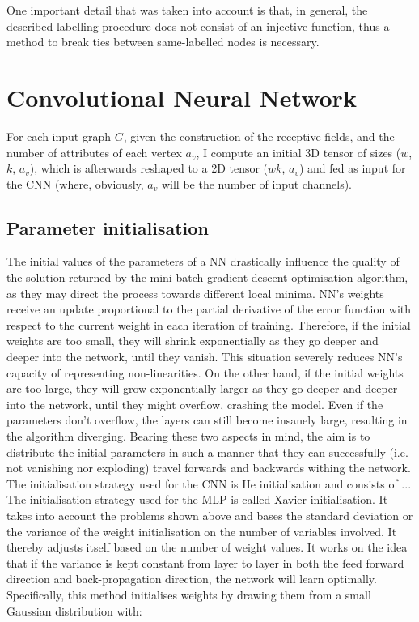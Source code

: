 One important detail that was taken into account is that, in general, the described labelling procedure does not consist of an injective function, thus a method to break ties between same-labelled nodes is necessary.

\section{Convolutional Neural Network}

For each input graph $G$, given the construction of the receptive fields, and the number of attributes of each vertex $a_v$, I compute an initial 3D tensor of sizes ($w$, $k$, $a_v$), which is afterwards reshaped to a 2D tensor ($wk$, $a_v$) and fed as input for the CNN (where, obviously, $a_v$ will be the number of input channels). \\

\subsection{Parameter initialisation}

The initial values of the parameters of a NN drastically influence the quality of the solution returned by the mini batch gradient descent optimisation algorithm, as they may direct the process towards different local minima. NN's weights receive an update proportional to the partial derivative of the error function with respect to the current weight in each iteration of training. Therefore, if the initial weights are too small, they will shrink exponentially as they go deeper and deeper into the network, until they vanish. This situation severely reduces NN's capacity of representing non-linearities. On the other hand, if the initial weights are too large, they will grow exponentially larger as they go deeper and deeper into the network, until they might overflow, crashing the model. Even if the parameters don't overflow, the layers can still become insanely large, resulting in the algorithm diverging. Bearing these two aspects in mind, the aim is to distribute the initial parameters in such a manner that they can successfully (i.e. not vanishing nor exploding) travel forwards and backwards withing the network. \\

The initialisation strategy used for the CNN is He initialisation and consists of ...\\

The initialisation strategy used for the MLP is called Xavier initialisation. It takes into account the problems shown above and bases the standard deviation or the variance of the weight initialisation on the number of variables involved. It thereby adjusts itself based on the number of weight values. It works on the idea that if the variance is kept constant from layer to layer in both the feed forward direction and back-propagation direction, the network will learn optimally. Specifically, this method initialises weights by drawing them from a small Gaussian distribution with: \\

